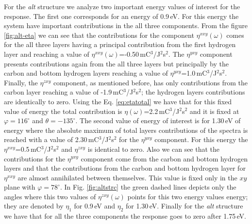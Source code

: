 \documentclass[pss]{wiley2sp} %
\begin{document}
For the \emph{alt} structure we analyze two important energy values of interest for the response. The first one corresponds for an energy of 0.9\,eV. For this energy the system have important contributions in the all three components. From the figure \ref{fig:alt-eta} we can see that the contributions for the component $\eta^{xxy}(\omega)$ comes for the all three layers having a principal contribution from the first hydrogen layer and reaching a value of $\eta^{xxy}(\omega)$=-0.50\,mC$^{3}$/J$^{2}$s$^{2}$. The $\eta^{yxy}$ component presents contributions again from the all three layers but principally by the carbon and bottom hydrogen layers reaching a value of $\eta^{yxy}$=1.0\,mC$^{3}$/J$^{2}$s$^{2}$. Finally, the $\eta^{zxy}$ component, as mentioned before, has only contributions from the carbon layer reaching a value of -1.9\,mC$^{3}$/J$^{2}$s$^{2}$; the hydrogen layers contributions are identically to zero. Using the Eq. \eqref{eq:etatotal} we have that for this fixed value of energy the total contribution is $\eta(\omega)$=2.2\,mC$^{3}$/J$^{2}$s$^{2}$ and it is fixed at $\varphi=116^{\circ}$ and $\theta=-135^{\circ}$. The second value of energy of interest is for 1.30\,eV of energy where the absolute maximum of total layers contributions of the spectra is reached with a value of 2.30\,mC$^{3}$/J$^{2}$s$^{2}$ for the $\eta^{yxy}$ component. For this energy the $\eta^{xxy}$=0.5\,mC$^{3}$/J$^{2}$s$^{2}$ and $\eta^{zxy}$ is identical to zero. Also we can see that the contributions for the $\eta^{yxy}$ component come from the carbon and bottom hydrogen layers and that the contributions from the carbon and bottom hydrogen layer for $\eta^{xxy}$ are almost annihilated between themselves. This value is fixed only in the $xy$ plane with $\varphi=78^{\circ}$. In Fig. \ref{fig:altstrc} the green dashed lines depicts only the angles where this two values of $\eta^{zxy}(\omega)$ points for this two energy values energy; they are denoted by $\eta_{1}$ for 0.9\,eV and $\eta_{2}$ for 1.30\,eV. Finally for the \emph{alt} structure  we have that for all the three components the response goes to zero after 1.75\,eV. 
\end{document}

